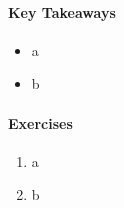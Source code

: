 \documentclass[
]{krantz}
\providecommand{\tightlist}{%
  \setlength{\itemsep}{0pt}\setlength{\parskip}{0pt}}
\begin{document}
\hypertarget{key-takeaways-9}{%
\paragraph*{Key Takeaways}\label{key-takeaways-9}}

\begin{itemize}
\tightlist
\item
  a
\item
  b
\end{itemize}

\hypertarget{exercises-9}{%
\paragraph*{Exercises}\label{exercises-9}}

\begin{enumerate}
\def\labelenumi{\arabic{enumi}.}
\tightlist
\item
  a
\item
  b
\end{enumerate}
\end{document}
